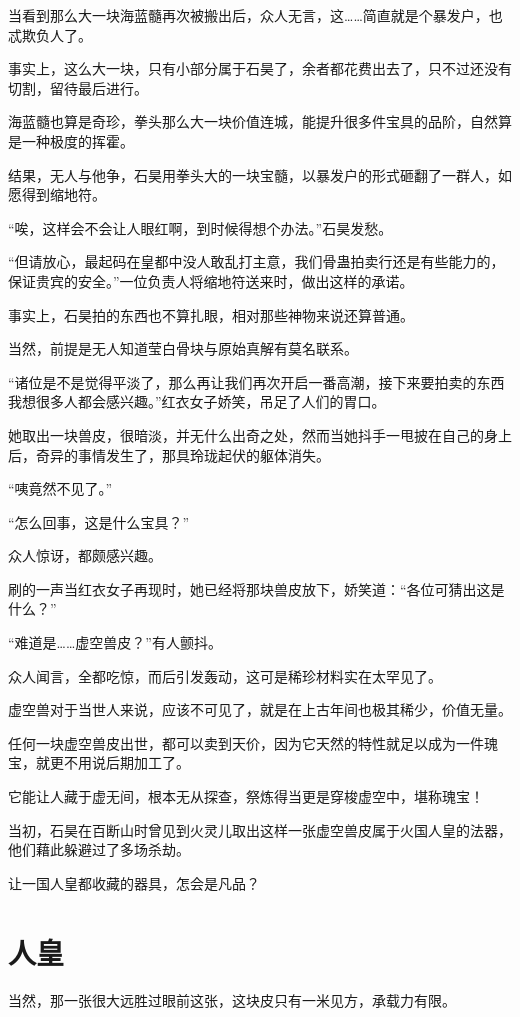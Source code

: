 当看到那么大一块海蓝髓再次被搬出后，众人无言，这……简直就是个暴发户，也忒欺负人了。

事实上，这么大一块，只有小部分属于石昊了，余者都花费出去了，只不过还没有切割，留待最后进行。

海蓝髓也算是奇珍，拳头那么大一块价值连城，能提升很多件宝具的品阶，自然算是一种极度的挥霍。

结果，无人与他争，石昊用拳头大的一块宝髓，以暴发户的形式砸翻了一群人，如愿得到缩地符。

“唉，这样会不会让人眼红啊，到时候得想个办法。”石昊发愁。

“但请放心，最起码在皇都中没人敢乱打主意，我们骨蛊拍卖行还是有些能力的，保证贵宾的安全。”一位负责人将缩地符送来时，做出这样的承诺。

事实上，石昊拍的东西也不算扎眼，相对那些神物来说还算普通。

当然，前提是无人知道莹白骨块与原始真解有莫名联系。

“诸位是不是觉得平淡了，那么再让我们再次开启一番高潮，接下来要拍卖的东西我想很多人都会感兴趣。”红衣女子娇笑，吊足了人们的胃口。

她取出一块兽皮，很暗淡，并无什么出奇之处，然而当她抖手一甩披在自己的身上后，奇异的事情发生了，那具玲珑起伏的躯体消失。

“咦竟然不见了。”

“怎么回事，这是什么宝具？”

众人惊讶，都颇感兴趣。

刷的一声当红衣女子再现时，她已经将那块兽皮放下，娇笑道：“各位可猜出这是什么？”

“难道是……虚空兽皮？”有人颤抖。

众人闻言，全都吃惊，而后引发轰动，这可是稀珍材料实在太罕见了。

虚空兽对于当世人来说，应该不可见了，就是在上古年间也极其稀少，价值无量。

任何一块虚空兽皮出世，都可以卖到天价，因为它天然的特性就足以成为一件瑰宝，就更不用说后期加工了。

它能让人藏于虚无间，根本无从探查，祭炼得当更是穿梭虚空中，堪称瑰宝！

当初，石昊在百断山时曾见到火灵儿取出这样一张虚空兽皮属于火国人皇的法器，他们藉此躲避过了多场杀劫。

让一国人皇都收藏的器具，怎会是凡品？

\section{人皇}

当然，那一张很大远胜过眼前这张，这块皮只有一米见方，承载力有限。

